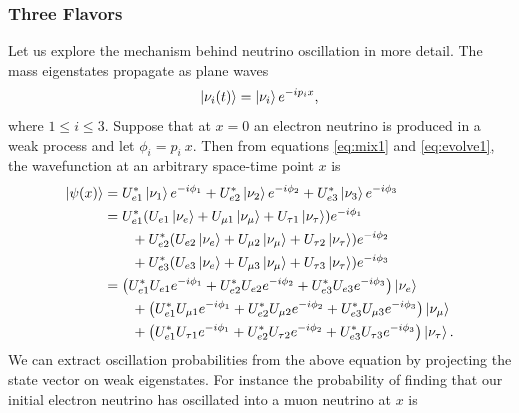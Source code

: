 \subsubsection{Three Flavors}
Let us explore the mechanism behind neutrino oscillation in more detail.
The mass eigenstates propagate as plane waves
\begin{equation}
  \label{eq:evolve1}
  \ket{\nu_i(t)}=\ket{\nu_i}e^{-ip_ix},
\end{equation}
where $1\leq i\leq3$. Suppose that at $x=0$ an electron neutrino
is produced in a weak process and let $\phi_i=p_i~x$. Then from equations
\eqref{eq:mix1} and \eqref{eq:evolve1}, the wavefunction at an arbitrary
space-time point $x$ is
\begin{equation}
  \begin{aligned}
    \ket{\psi(x)}&=U_{e1}^*\ket{\nu_1}e^{-i\phi_1}
                  +U_{e2}^*\ket{\nu_2}e^{-i\phi_2}
                  +U_{e3}^*\ket{\nu_3}e^{-i\phi_3} \\
                 &=U_{e1}^*(U_{e1}\ket{\nu_e}+U_{\mu 1}\ket{\nu_\mu}
                   +U_{\tau 1}\ket{\nu_\tau})e^{-i\phi_1} \\
                 &~~~~~~
                  +U_{e2}^*(U_{e2}\ket{\nu_e}+U_{\mu 2}\ket{\nu_\mu}
                   +U_{\tau 2}\ket{\nu_\tau})e^{-i\phi_2} \\
                 &~~~~~~
                  +U_{e3}^*(U_{e3}\ket{\nu_e}+U_{\mu 3}\ket{\nu_\mu}
                   +U_{\tau 3}\ket{\nu_\tau})e^{-i\phi_3} \\
                 &=\left(U_{e1}^*U_{e1}e^{-i\phi_1}
                    +U_{e2}^*U_{e2}e^{-i\phi_2}
                    +U_{e3}^*U_{e3}e^{-i\phi_3}\right)\ket{\nu_e} \\
                 &~~~~~~
                   +\left(U_{e1}^*U_{\mu 1}e^{-i\phi_1}
                    +U_{e2}^*U_{\mu 2}e^{-i\phi_2}
                    +U_{e3}^*U_{\mu 3}e^{-i\phi_3}\right)\ket{\nu_\mu} \\
                 &~~~~~~
                   +\left(U_{e1}^*U_{\tau 1}e^{-i\phi_1}
                    +U_{e2}^*U_{\tau 2}e^{-i\phi_2}
                    +U_{e3}^*U_{\tau 3}e^{-i\phi_3}\right)\ket{\nu_\tau}.
  \end{aligned}
\end{equation}
We can extract oscillation probabilities from the above equation by projecting
the state vector on weak eigenstates. For instance the probability of finding
that our initial electron neutrino has oscillated into a muon neutrino at $x$ is
